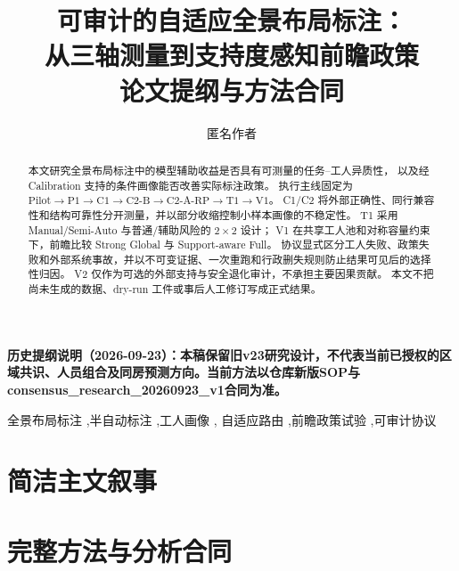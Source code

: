 \documentclass[preprint,12pt]{elsarticle}
\begin{document}
\noindent\textbf{历史提纲说明（2026-09-23）：本稿保留旧v23研究设计，不代表当前已授权的区域共识、人员组合及同房预测方向。当前方法以仓库新版SOP与consensus\_research\_20260923\_v1合同为准。}\par\bigskip

\begin{frontmatter}
\title{可审计的自适应全景布局标注：\\
从三轴测量到支持度感知前瞻政策\\
\large 论文提纲与方法合同}
\author{匿名作者}

\begin{abstract}
本文研究全景布局标注中的模型辅助收益是否具有可测量的任务--工人异质性，
以及经 Calibration 支持的条件画像能否改善实际标注政策。
执行主线固定为
\(\mathrm{Pilot}\rightarrow\mathrm{P1}\rightarrow\mathrm{C1}\rightarrow\mathrm{C2\text{-}B}
\rightarrow\mathrm{C2\text{-}A\text{-}RP}\rightarrow\mathrm{T1}\rightarrow\mathrm{V1}\)。
C1/C2 将外部正确性、同行兼容性和结构可靠性分开测量，并以部分收缩控制小样本画像的不稳定性。
T1 采用 Manual/Semi-Auto 与普通/辅助风险的 $2\times2$ 设计；
V1 在共享工人池和对称容量约束下，前瞻比较 Strong Global 与 Support-aware Full。
协议显式区分工人失败、政策失败和外部系统事故，并以不可变证据、一次重跑和行政删失规则防止结果可见后的选择性归因。
V2 仅作为可选的外部支持与安全退化审计，不承担主要因果贡献。
本文不把尚未生成的数据、dry-run 工件或事后人工修订写成正式结果。
\end{abstract}

\begin{keyword}
全景布局标注 \sep 半自动标注 \sep 工人画像 \sep
自适应路由 \sep 前瞻政策试验 \sep 可审计协议
\end{keyword}
\end{frontmatter}

\tableofcontents
\clearpage

\part{简洁主文叙事}


\clearpage
\part{完整方法与分析合同}


















\end{document}
